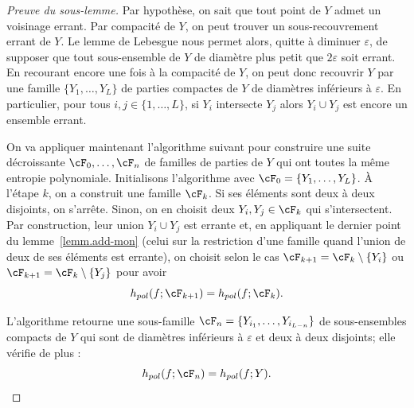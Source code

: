 \begin{proof}[Preuve du sous-lemme]
Par hypothèse, on sait que tout point de $Y$ admet un voisinage errant. Par compacité de $Y$, on peut trouver un sous-recouvrement errant de $Y$. Le lemme de Lebesgue nous permet alors, quitte à diminuer $\varepsilon$, de supposer que tout sous-ensemble de $Y$ de diamètre plus petit que $2\varepsilon$ soit errant. En recourant encore une fois à la compacité de $Y$, on peut donc recouvrir $Y$ par une famille $\{ Y_1, \dots,Y_L\}$ {de parties compactes de $Y$} de diamètres inférieurs à $\varepsilon$. {En particulier,} pour tous $i,j \in \{1, \dots, L\}$, si $Y_i$ intersecte $Y_j$ alors $Y_i \cup Y_j$ est encore un ensemble errant.

On va appliquer maintenant l'algorithme suivant pour construire une suite décroissante $\cF_0, \dots, \cF_n$ de familles {de parties} de $Y$ qui ont toutes la même entropie polynomiale. Initialisons l'algorithme avec $\cF_0 =
\{ Y_1, \dots,Y_L\}$. \`A l'étape $k$, on a construit une famille $\cF_k$. Si ses éléments sont deux à deux disjoints, on s'arrête. Sinon, on en choisit deux $Y_i, Y_j \in \cF_k$ qui s'intersectent. Par construction, leur union $Y_i \cup Y_j$ est errante et, en appliquant le dernier point du lemme~\ref{lemm.add-mon} (celui sur la restriction d'une famille quand l'union de deux de ses éléments est errante), on choisit selon le cas $\cF_{k+1} = \cF_k \setminus \{ Y_i\}$ ou $\cF_{k+1} = \cF_k \setminus \{ Y_j\}$ pour avoir
\[
h_{pol}(f;\cF_{k+1}) = h_{pol}(f;\cF_{k}).
\]

L'algorithme retourne une sous-famille $\cF_n = \{Y_{i_1}, \dots, Y_{i_{L-n}}\}$ de sous-ensembles compacts de $Y$ qui sont de diamètres inférieurs à $\varepsilon$ et deux à deux disjoints; elle vérifie de plus :
\[
h_{pol}(f;\cF_n) = h_{pol}(f;Y).\qedhere
\]
\end{proof}

